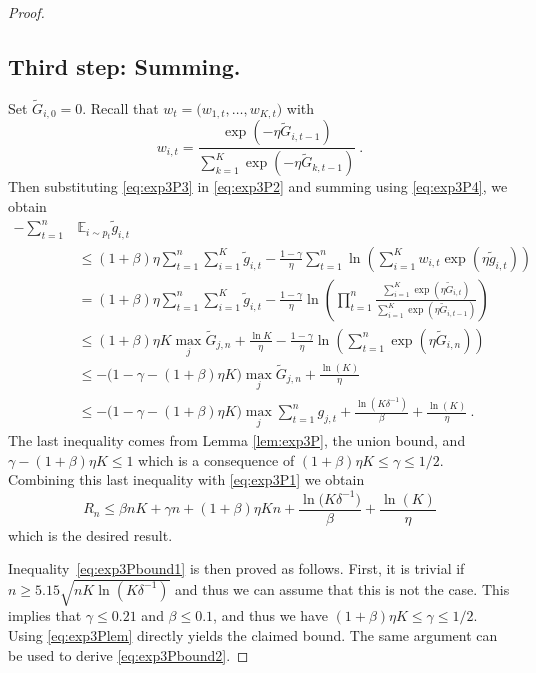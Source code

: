 \documentclass[11pt]{hackednow}
\newcommand{\E}{\mathbb{E}}
\renewcommand{\tilde}{\widetilde}
\begin{document}
\begin{proof}
\subsection*{Third step: Summing.}
Set $\tilde{G}_{i,0} = 0$. Recall that $w_t=\bigl(w_{1,t},\hdots,w_{K,t}\bigr)$ with 
\begin{equation} \label{eq:exp3P4}
w_{i,t} = \frac{\exp{\left(- \eta \tilde{G}_{i,t-1}\right)}}{\sum_{k=1}^K \exp{\left(- \eta \tilde{G}_{k,t-1}\right)}}~.
\end{equation}
Then substituting \eqref{eq:exp3P3} in \eqref{eq:exp3P2} and summing using \eqref{eq:exp3P4}, we obtain
\begin{align*}
- \sum_{t=1}^n &\E_{i \sim p_t} \tilde{g}_{i,t} \\
& \leq (1+\beta) \eta \sum_{t=1}^n \sum_{i=1}^K \tilde{g}_{i,t} - \frac{1-\gamma}{\eta} \sum_{t=1}^n \ln \left( \sum_{i=1}^K w_{i,t} \exp{\left( \eta \tilde{g}_{i,t} \right)}  \right) \\
& = (1+\beta) \eta \sum_{t=1}^n \sum_{i=1}^K \tilde{g}_{i,t} - \frac{1-\gamma}{\eta} \ln \left( \prod_{t=1}^n \frac{\sum_{i=1}^K \exp(\eta \tilde{G}_{i,t})}{\sum_{i=1}^K \exp(\eta \tilde{G}_{i,t-1})} \right) \\
& \leq (1+\beta) \eta K \max_j \tilde{G}_{j,n} + \frac{\ln K}{\eta} - \frac{1-\gamma}{\eta} \ln \left( \sum_{t=1}^n \exp(\eta \tilde{G}_{i,n}) \right) \\
& \leq - \bigl(1 - \gamma - (1+\beta) \eta K\bigr) \max_j \tilde{G}_{j,n} + \frac{\ln(K)}{\eta} \\
& \leq - \bigl(1 - \gamma - (1+\beta) \eta K\bigr) \max_j \sum_{t=1}^n g_{j,t} + \frac{\ln(K \delta^{-1})}{\beta} + \frac{\ln(K)}{\eta}~.
\end{align*}
The last inequality comes from Lemma \ref{lem:exp3P}, the union bound, and $\gamma - (1+\beta) \eta K \leq 1$ which is a consequence of $(1+\beta) \eta K \leq \gamma \leq 1/2$. Combining this last inequality with \eqref{eq:exp3P1} we obtain
$$R_n \leq \beta n K + \gamma n + (1+\beta) \eta K n + \frac{\ln\bigl(K \delta^{-1}\bigr)}{\beta} + \frac{\ln(K)}{\eta}$$
which is the desired result.

Inequality~\eqref{eq:exp3Pbound1} is then proved as follows. First, it is trivial if $n \geq 5.15 \sqrt{n K \ln(K \delta^{-1})}$ and thus we can assume that this is not the case. This implies that $\gamma \leq 0.21$ and $\beta \leq 0.1$, and thus we have $(1+\beta) \eta K \leq \gamma \leq 1/2$. Using \eqref{eq:exp3Plem} directly yields the claimed bound. The same argument can be used to derive \eqref{eq:exp3Pbound2}.
\end{proof}
\end{document}
